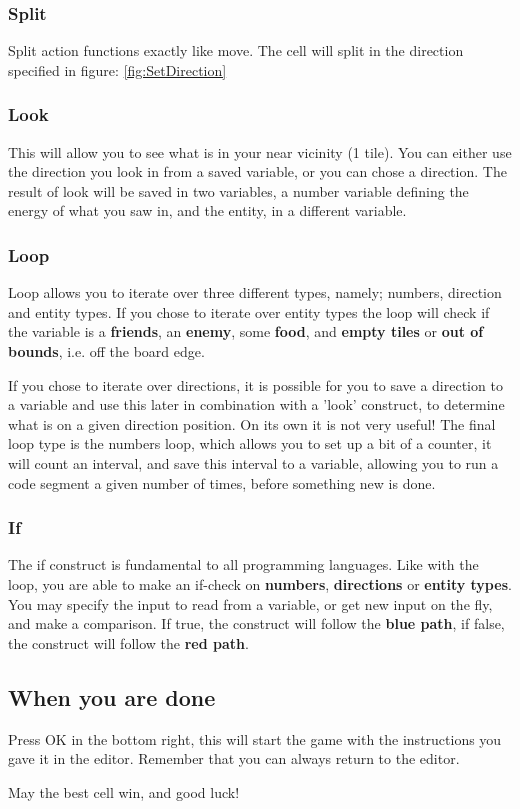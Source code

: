 \documentclass[12pt]{article}
\begin{document}
\subsubsection{Split}

Split action functions exactly like move. The cell will split in the direction specified in figure: \ref{fig:SetDirection}

\subsubsection{Look}

This will allow you to see what is in your near vicinity (1 tile). You can either use the direction you look in from a saved variable, or you can chose a direction. The result of look will be saved in two variables, a number variable defining the energy of what you saw in, and the entity, in a different variable.

\subsubsection{Loop}

Loop allows you to iterate over three different types, namely; numbers, direction and entity types. If you chose to iterate over entity types the loop will check if the variable is a \textbf{friends}, an \textbf{enemy}, some \textbf{food}, and \textbf{empty tiles} or \textbf{out of bounds}, i.e. off the board edge.


If you chose to iterate over directions, it is possible for you to save a direction to a variable and use this later in combination with a 'look' construct, to determine what is on a given direction position. On its own it is not very useful! The final loop type is the numbers loop, which allows you to set up a bit of a counter, it will count an interval, and save this interval to a variable, allowing you to run a code segment a given number of times, before something new is done.

\subsubsection{If}

The if construct is fundamental to all programming languages. Like with the loop, you are able to make an if-check on \textbf{numbers}, \textbf{directions} or \textbf{entity types}. You may specify the input to read from a variable, or get new input on the fly, and make a comparison. If true, the construct will follow the \textbf{blue path}, if false, the construct will follow the \textbf{red path}.


\subsection{When you are done}

Press OK in the bottom right, this will start the game with the instructions you gave it in the editor. Remember that you can always return to the editor.


May the best cell win, and good luck!
\end{document}
